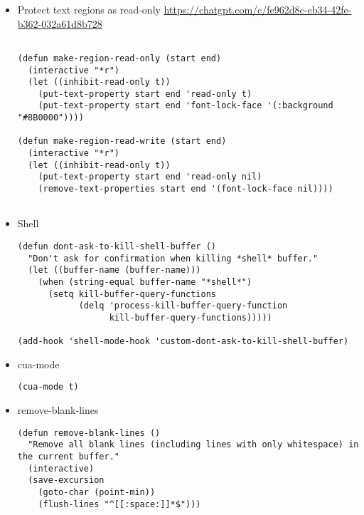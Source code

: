 \documentclass{article}
\begin{document}
\begin{itemize}
\begin{itemize}
\begin{verbatim}
(defun org-remove-readonly ()
  (interactive)
  (let ((buf-mod (buffer-modified-p)))
    (org-map-entries
     (lambda ()
       (let* ((inhibit-read-only t))
     (org-mark-subtree)
     (remove-text-properties (region-beginning) (region-end) '(read-only t))))
     "read_only")
    (unless buf-mod
      (set-buffer-modified-p nil))))

(add-hook 'org-mode-hook 'org-mark-readonly)
\end{verbatim}

\item Protect text regions as read-only
\label{sec:org1a8cb54}
\url{https://chatgpt.com/c/fe962d8c-eb34-42fe-b362-032a61d8b728}
\begin{verbatim}

(defun make-region-read-only (start end)
  (interactive "*r")
  (let ((inhibit-read-only t))
    (put-text-property start end 'read-only t)
    (put-text-property start end 'font-lock-face '(:background "#8B0000"))))

(defun make-region-read-write (start end)
  (interactive "*r")
  (let ((inhibit-read-only t))
    (put-text-property start end 'read-only nil)
    (remove-text-properties start end '(font-lock-face nil))))


\end{verbatim}
\item Shell
\label{sec:orge373299}
\begin{verbatim}
(defun dont-ask-to-kill-shell-buffer ()
  "Don't ask for confirmation when killing *shell* buffer."
  (let ((buffer-name (buffer-name)))
    (when (string-equal buffer-name "*shell*")
      (setq kill-buffer-query-functions
            (delq 'process-kill-buffer-query-function
                  kill-buffer-query-functions)))))

(add-hook 'shell-mode-hook 'custom-dont-ask-to-kill-shell-buffer)

\end{verbatim}

\item cua-mode
\label{sec:org5e06f8c}
\begin{verbatim}
(cua-mode t)
\end{verbatim}
\item remove-blank-lines
\label{sec:org08954f5}
\begin{verbatim}
(defun remove-blank-lines ()
  "Remove all blank lines (including lines with only whitespace) in the current buffer."
  (interactive)
  (save-excursion
    (goto-char (point-min))
    (flush-lines "^[[:space:]]*$")))




\end{verbatim}
\end{itemize}
\end{itemize}
\end{document}
